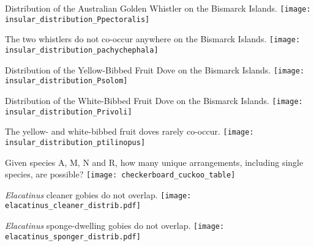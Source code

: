 \documentclass[t]{beamer}
\begin{document}
\begin{frame}{Distribution of the Australian Golden Whistler on the Bismarck Islands.}
	\centering
		\texttt{[image: insular\_distribution\_Ppectoralis]}\\
\end{frame}

\begin{frame}{The two whistlers do not co-occur anywhere on the Bismarck Islands.}
	\centering
		\texttt{[image: insular\_distribution\_pachychephala]}\\
\end{frame}

\begin{frame}{Distribution of the Yellow-Bibbed Fruit Dove on the Bismarck Islands.}
	\centering
		\texttt{[image: insular\_distribution\_Psolom]}\\
\end{frame}

\begin{frame}{Distribution of the White-Bibbed Fruit Dove on the Bismarck Islands.}
	\centering
		\texttt{[image: insular\_distribution\_Privoli]}\\
\end{frame}

\begin{frame}{The yellow- and white-bibbed fruit doves rarely co-occur.}
	\centering
		\texttt{[image: insular\_distribution\_ptilinopus]}\\
\end{frame}

\begin{frame}{Given species A, M, N and R, how many unique arrangements, including single species, are possible?}
	\pause
	\centering
		\texttt{[image: checkerboard\_cuckoo\_table]}\\
\end{frame}

\begin{frame}{\textit{Elacatinus} cleaner gobies do not overlap.}
	\centering
		\texttt{[image: elacatinus\_cleaner\_distrib.pdf]}\\
\end{frame}

\begin{frame}{\textit{Elacatinus} sponge-dwelling gobies do not overlap.}
	\centering
		\texttt{[image: elacatinus\_sponger\_distrib.pdf]}\\
\end{frame}
\end{document}
